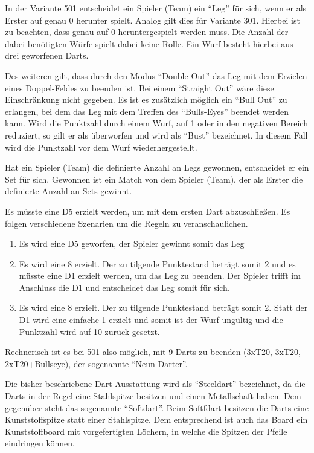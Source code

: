 In der Variante 501 entscheidet ein Spieler (Team) ein "`Leg"' für sich, wenn er als Erster auf genau 0 herunter spielt. Analog gilt dies für Variante 301.
Hierbei ist zu beachten, dass genau auf 0 heruntergespielt werden muss.
Die Anzahl der dabei benötigten Würfe spielt dabei keine Rolle. Ein Wurf besteht hierbei aus drei geworfenen Darts.
 
Des weiteren gilt, dass durch den Modus "`Double Out"' das Leg mit dem Erzielen eines Doppel-Feldes zu beenden ist. Bei einem "`Straight Out"' wäre diese Einschränkung nicht gegeben.
Es ist es zusätzlich möglich ein "`Bull Out"' zu erlangen, bei dem das Leg mit dem Treffen des "`Bulls-Eyes"' beendet werden kann. 
Wird die Punktzahl durch einem Wurf, auf 1 oder in den negativen Bereich reduziert, so gilt er als überworfen und wird als "`Bust"' bezeichnet. In diesem Fall wird die Punktzahl vor dem Wurf wiederhergestellt. \autocite[5]{DartsRegel2016} 

Hat ein Spieler (Team) die definierte Anzahl an Legs gewonnen, entscheidet er ein Set für sich. Gewonnen ist ein Match von dem Spieler (Team), der als Erster die definierte Anzahl an Sets gewinnt.

\begin{example*} 

Es müsste eine D5 erzielt werden, um mit dem ersten Dart abzuschließen. Es folgen verschiedene Szenarien um die Regeln zu veranschaulichen.
\begin{enumerate}
	\item Es wird eine D5 geworfen, der Spieler gewinnt somit das Leg
	\item Es wird eine 8 erzielt. Der zu tilgende Punktestand beträgt somit 2 und es müsste eine D1 erzielt werden, um das Leg zu beenden. Der Spieler trifft im Anschluss die D1 und entscheidet das Leg somit für sich. 
	\item Es wird eine 8 erzielt. Der zu tilgende Punktestand beträgt somit 2. Statt der D1 wird eine einfache 1 erzielt und somit ist der Wurf ungültig und die Punktzahl wird auf 10 zurück gesetzt.
\end{enumerate}
\end{example*}

Rechnerisch ist es bei 501 also möglich, mit 9 Darts zu beenden (3xT20, 3xT20, 2xT20+Bullseye), der sogenannte "`Neun Darter"'.

Die bisher beschriebene Dart Ausstattung wird als "`Steeldart"' bezeichnet, da die Darts in der Regel eine Stahlspitze besitzen und einen Metallschaft haben. Dem gegenüber steht das sogenannte "`Softdart"'. Beim Softfdart besitzen die Darts eine Kunststoffspitze statt einer Stahlspitze. Dem entsprechend ist auch das Board ein Kunststoffboard mit vorgefertigten Löchern, in welche die Spitzen der Pfeile eindringen können. 


